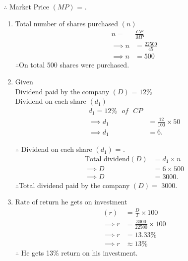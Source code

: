\documentclass[journal,12pt,twocolumn]{IEEEtran}
\begin{document}
$\therefore$ Market Price \((MP)\) =  . 
\begin{enumerate}
    \item 
    Total number of shares purchased \((n)\) 
    \begin{align*}
       n =&\frac{CP}{MP} \\
       \implies n &= \frac{22500}{45}\\
       \implies n &= 500
    \end{align*}
    $\therefore$On total 500 shares were purchased.
    \item
    Given\\
    Dividend paid by the company \((D)\) = $12\%$\\
    Dividend on each share \((d_1)\)  
    \begin{align*}
       d_1 = 12\% \text{ $of$ }CP\\
      \implies d_1 &= \frac{12}{100}\times 50\\  \implies d_1 &= 6 .
    \end{align*}
    
    $\therefore$ Dividend on each share \((d_1)\) = .
    \begin{align*}
       \text{Total dividend\((D)\)} &= d_1 \times n \\
       \implies D &= 6 \times 500 \\
       \implies D &= 3000 .
    \end{align*}
    $\therefore$Total dividend paid by the company \((D) =\) \rupee\(3000\).
    \item
    Rate of return he gets on investment
    \begin{align*}
        (r) &= \frac{D}{T} \times 100\\
        \implies r &= \frac{3000}{22500}\times 100\\
        \implies r &= 13.33\%\\
        \implies r &\approx 13\%
    \end{align*}
    $\therefore$ He gets 13\% return on his investment.
\end{enumerate}
\end{document}
